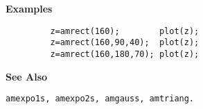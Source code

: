 {\bf \large \sf Examples}
\begin{verbatim}
         z=amrect(160);        plot(z);
         z=amrect(160,90,40);  plot(z);
         z=amrect(160,180,70); plot(z);
\end{verbatim}
\vspace*{.5cm}


{\bf \large \sf See Also}\\
\hspace*{1.5cm}
\begin{minipage}[t]{13.5cm}
\begin{verbatim}
amexpo1s, amexpo2s, amgauss, amtriang.
\end{verbatim}
\end{minipage}



